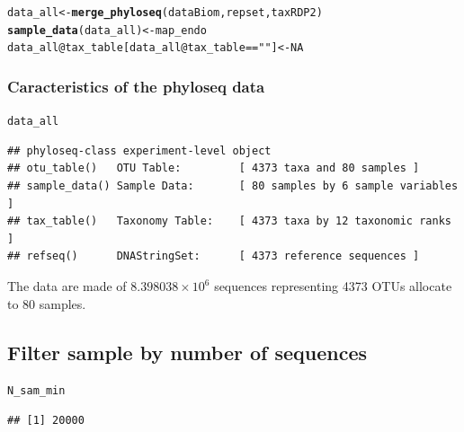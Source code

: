 \documentclass[12pt]{article}\usepackage[]{graphicx}\usepackage[]{color}
\makeatletter
\newcommand{\hlnum}[1]{\textcolor[rgb]{0.686,0.059,0.569}{#1}}%
\newcommand{\hlstr}[1]{\textcolor[rgb]{0.192,0.494,0.8}{#1}}%
\newcommand{\hlopt}[1]{\textcolor[rgb]{0,0,0}{#1}}%
\newcommand{\hlstd}[1]{\textcolor[rgb]{0.345,0.345,0.345}{#1}}%
\newcommand{\hlkwb}[1]{\textcolor[rgb]{0.69,0.353,0.396}{#1}}%
\newcommand{\hlkwc}[1]{\textcolor[rgb]{0.333,0.667,0.333}{#1}}%
\newcommand{\hlkwd}[1]{\textcolor[rgb]{0.737,0.353,0.396}{\textbf{#1}}}%
\newenvironment{kframe}{%
 \def\at@end@of@kframe{}%
 \ifinner\ifhmode%
  \def\at@end@of@kframe{\end{minipage}}%
  \begin{minipage}{\columnwidth}%
 \fi\fi%
 \def\FrameCommand##1{\hskip\@totalleftmargin \hskip-\fboxsep
 \colorbox{shadecolor}{##1}\hskip-\fboxsep
     \hskip-\linewidth \hskip-\@totalleftmargin \hskip\columnwidth}%
 \MakeFramed {\advance\hsize-\width
   \@totalleftmargin\z@ \linewidth\hsize
   \@setminipage}}%
 {\par\unskip\endMakeFramed%
 \at@end@of@kframe}
\newenvironment{knitrout}{}{} %
\numberwithin{figure}{section}
\makeatother
\begin{document}
\begin{knitrout}\small
{}\color{fgcolor}\begin{kframe}
\begin{alltt}
\hlstd{data_all} \hlkwb{<-} \hlkwd{merge_phyloseq}\hlstd{(dataBiom, repset, taxRDP2)}
\hlkwd{sample_data}\hlstd{(data_all)} \hlkwb{<-} \hlstd{map_endo}
\hlstd{data_all}\hlopt{@}\hlkwc{tax_table}\hlstd{[data_all}\hlopt{@}\hlkwc{tax_table} \hlopt{==} \hlstr{""}\hlstd{]} \hlkwb{<-} \hlnum{NA}
\end{alltt}
\end{kframe}
\end{knitrout}

\subsubsection{Caracteristics of the phyloseq data}
  
\begin{knitrout}\small
{}\color{fgcolor}\begin{kframe}
\begin{alltt}
\hlstd{data_all}
\end{alltt}
\begin{verbatim}
## phyloseq-class experiment-level object
## otu_table()   OTU Table:         [ 4373 taxa and 80 samples ]
## sample_data() Sample Data:       [ 80 samples by 6 sample variables ]
## tax_table()   Taxonomy Table:    [ 4373 taxa by 12 taxonomic ranks ]
## refseq()      DNAStringSet:      [ 4373 reference sequences ]
\end{verbatim}
\end{kframe}
\end{knitrout}

The data are made of \ensuremath{8.398038\times 10^{6}} sequences representing 4373 OTUs allocate to 80 samples.

  \subsection{Filter sample by number of sequences}

\begin{knitrout}\small
{}\color{fgcolor}\begin{kframe}
\begin{alltt}
\hlstd{N_sam_min}
\end{alltt}
\begin{verbatim}
## [1] 20000
\end{verbatim}
\end{kframe}
\end{knitrout}
\end{document}
